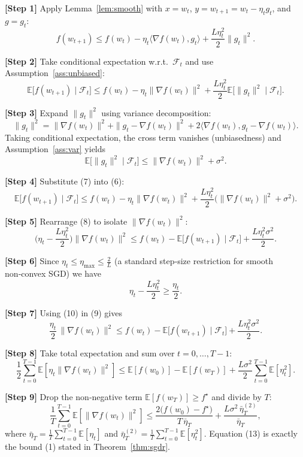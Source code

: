 \documentclass[11pt]{article}
\newcommand{\E}{\mathbb{E}}
\begin{document}
\noindent\textbf{[Step 1]} Apply Lemma~\ref{lem:smooth} with $x=w_t$, $y=w_{t+1}=w_t-\eta_t g_t$, and $g=g_t$:
\[
f(w_{t+1})\le f(w_t)-\eta_t\langle\nabla f(w_t),g_t\rangle+\frac{L\eta_t^{2}}{2}\|g_t\|^{2}.
\tag{5}
\]

\noindent\textbf{[Step 2]} Take conditional expectation w.r.t.\ $\mathcal{F}_t$ and use Assumption~\ref{ass:unbiased}:
\[
\E\big[f(w_{t+1})\mid\mathcal{F}_t\big]
\le f(w_t)-\eta_t\|\nabla f(w_t)\|^{2}
+\frac{L\eta_t^{2}}{2}\E\big[\|g_t\|^{2}\mid\mathcal{F}_t\big].
\tag{6}
\]

\noindent\textbf{[Step 3]} Expand $\|g_t\|^{2}$ using variance decomposition:
\[
\|g_t\|^{2}= \|\nabla f(w_t)\|^{2}
+ \|g_t-\nabla f(w_t)\|^{2}
+2\langle\nabla f(w_t),g_t-\nabla f(w_t)\rangle.
\]
Taking conditional expectation, the cross term vanishes (unbiasedness) and Assumption~\ref{ass:var} yields
\[
\E\big[\|g_t\|^{2}\mid\mathcal{F}_t\big]
\le \|\nabla f(w_t)\|^{2}+\sigma^{2}.
\tag{7}
\]

\noindent\textbf{[Step 4]} Substitute (7) into (6):
\[
\E\big[f(w_{t+1})\mid\mathcal{F}_t\big]
\le f(w_t)-\eta_t\|\nabla f(w_t)\|^{2}
+\frac{L\eta_t^{2}}{2}\big(\|\nabla f(w_t)\|^{2}+\sigma^{2}\big).
\tag{8}
\]

\noindent\textbf{[Step 5]} Rearrange (8) to isolate $\|\nabla f(w_t)\|^{2}$:
\[
\Big(\eta_t-\frac{L\eta_t^{2}}{2}\Big)\|\nabla f(w_t)\|^{2}
\le f(w_t)-\E\big[f(w_{t+1})\mid\mathcal{F}_t\big]
+\frac{L\eta_t^{2}\sigma^{2}}{2}.
\tag{9}
\]

\noindent\textbf{[Step 6]} Since $\eta_t\le\eta_{\max}\le\frac{2}{L}$ (a standard step‑size restriction for smooth non‑convex SGD) we have
\[
\eta_t-\frac{L\eta_t^{2}}{2}\ge\frac{\eta_t}{2}.
\tag{10}
\]

\noindent\textbf{[Step 7]} Using (10) in (9) gives
\[
\frac{\eta_t}{2}\,\|\nabla f(w_t)\|^{2}
\le f(w_t)-\E\big[f(w_{t+1})\mid\mathcal{F}_t\big]
+\frac{L\eta_t^{2}\sigma^{2}}{2}.
\tag{11}
\]

\noindent\textbf{[Step 8]} Take total expectation and sum over $t=0,\dots,T-1$:
\[
\frac{1}{2}\sum_{t=0}^{T-1}\E[\eta_t\|\nabla f(w_t)\|^{2}]
\le \E[f(w_0)]-\E[f(w_T)]
+\frac{L\sigma^{2}}{2}\sum_{t=0}^{T-1}\E[\eta_t^{2}].
\tag{12}
\]

\noindent\textbf{[Step 9]} Drop the non‑negative term $\E[f(w_T)]\ge f^{\star}$ and divide by $T$:
\[
\frac{1}{T}\sum_{t=0}^{T-1}\E[\|\nabla f(w_t)\|^{2}]
\le
\frac{2\big(f(w_0)-f^{\star}\big)}{T\,\bar\eta_T}
+\frac{L\sigma^{2}\,\bar\eta_T^{(2)}}{\bar\eta_T},
\tag{13}
\]
where $\bar\eta_T=\frac{1}{T}\sum_{t=0}^{T-1}\E[\eta_t]$ and
$\bar\eta_T^{(2)}=\frac{1}{T}\sum_{t=0}^{T-1}\E[\eta_t^{2}]$.
Equation (13) is exactly the bound (1) stated in Theorem~\ref{thm:sgdr}.
\end{document}
